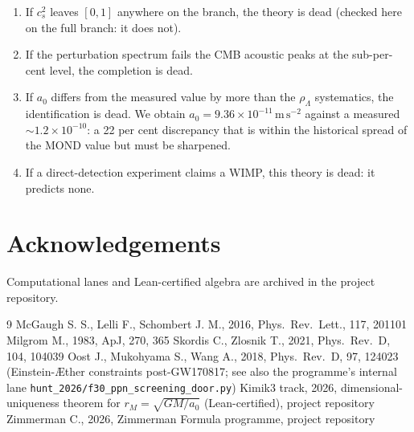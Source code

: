 \documentclass[useAMS,usenatbib]{mnras}
\begin{document}
\begin{enumerate}
\item If $c_s^2$ leaves $[0,1]$ anywhere on the branch, the theory is dead
(checked here on the full branch: it does not).
\item If the perturbation spectrum fails the CMB acoustic peaks at the
sub-per-cent level, the completion is dead.
\item If $a_0$ differs from the measured value by more than the
$\rho_\Lambda$ systematics, the identification is dead.  We obtain
$a_0=9.36\times10^{-11}\,\mathrm{m\,s^{-2}}$ against a measured
$\sim1.2\times10^{-10}$: a 22 per cent discrepancy that is within the
historical spread of the MOND value but must be sharpened.
\item If a direct-detection experiment claims a WIMP, this theory is dead:
it predicts none.
\end{enumerate}

\section*{Acknowledgements}
Computational lanes and Lean-certified algebra are archived in the
project repository.


\begin{thebibliography}{9}
 McGaugh S. S., Lelli F., Schombert J. M., 2016,
  Phys.\ Rev.\ Lett., 117, 201101
 Milgrom M., 1983, ApJ, 270, 365
 Skordis C., Zlosnik T., 2021, Phys.\ Rev.\ D,
  104, 104039
 Oost J., Mukohyama S., Wang A., 2018, Phys.\ Rev.\ D, 97,
  124023 (Einstein-\AE{}ther constraints post-GW170817; see also the
  programme's internal lane \texttt{hunt\_2026/f30\_ppn\_screening\_door.py})
 Kimik3 track, 2026, dimensional-uniqueness theorem for
  $r_M=\sqrt{GM/a_0}$ (Lean-certified), project repository
 Zimmerman C., 2026, Zimmerman Formula
  programme, project repository
\end{thebibliography}

\bsp
\label{lastpage}
\end{document}
